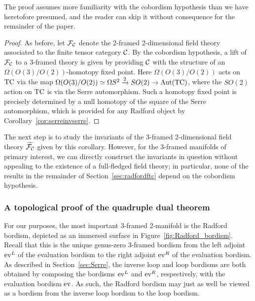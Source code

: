 \documentclass{amsart}
\begin{document}
\nid The proof assumes more familiarity with the cobordism hypothesis than we have heretofore presumed, and the reader can skip it without consequence for the remainder of the paper.

\begin{proof}
As before, let $\mathcal F_\mathcal C$ denote the 2-framed 2-dimensional field theory associated to the finite tensor category $\mathcal C$.  By the cobordism hypothesis, a lift of $\mathcal F_\mathcal C$ to a 3-framed theory is given by providing $\mathcal C$ with the structure of an $\Omega(O(3)/O(2))$-homotopy fixed point.  Here $\Omega(O(3)/O(2))$ acts on $\mathrm{TC}$ via the map $\Omega(O(3)/O(2)) \simeq \Omega S^2 \xrightarrow{2} SO(2) \rightarrow \mathrm{Aut}(\mathrm{TC})$, where the $SO(2)$ action on $\mathrm{TC}$ is via the Serre automorphism.  Such a homotopy fixed point is precisely determined by a null homotopy of the square of the Serre automorphism, which is provided for any Radford object by Corollary~\ref{cor:serreinvserre}.
\end{proof}

The next step is to study the invariants of the 3-framed 2-dimensional field theory $\widetilde{\mathcal F_\mathcal C}$ given by this corollary.  However, for the 3-framed manifolds of primary interest, we can directly construct the invariants in question without appealing to the existence of a full-fledged field theory; in particular, none of the results in the remainder of Section~\ref{sec:radfordftc} depend on the cobordism hypothesis.

\subsubsection{A topological proof of the quadruple dual theorem} \label{sec:topquaddual}

For our purposes, the most important 3-framed 2-manifold is the Radford bordism, depicted as an immersed surface in Figure~\ref{fig:Radford_bordism}.  Recall that this is the unique genus-zero 3-framed bordism from the left adjoint $\mathrm{ev}^L$ of the evaluation bordism to the right adjoint $\mathrm{ev}^R$ of the evaluation bordism.  As described in Section~\ref{sec:Serre}, the inverse loop and loop bordisms are both obtained by composing the bordisms $\mathrm{ev}^L$ and $\mathrm{ev}^R$, respectively, with the evaluation bordism $\mathrm{ev}$.  As such, the Radford bordism may just as well be viewed as a bordism from the inverse loop bordism to the loop bordism.  
\end{document}
